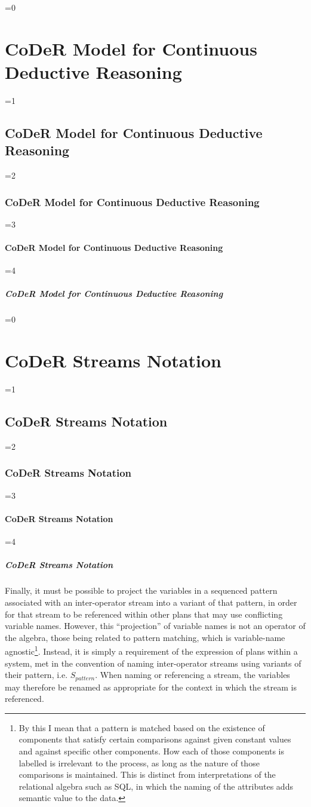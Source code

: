 \documentclass[twocolumn,preprint,3p,number]{elsarticle}
\theoremstyle{plain}
\theoremstyle{definition}
\newcounter{nestingdepth}
\newenvironment{nestedsection}[2]{
  \ifnum\value{nestingdepth}=0
    \chapter{#1}
  \else
    \ifnum\value{nestingdepth}=1
      \section{#1}
    \else
      \ifnum\value{nestingdepth}=2
        \subsection{#1}
      \else
        \ifnum\value{nestingdepth}=3
          \subsubsection{#1}
        \else
          \ifnum\value{nestingdepth}=4
            \paragraph{#1}
          \else
            \PackageError{nestedsections}{Maximum nesting level exceeded!}{uh oh!}
          \fi
        \fi
      \fi
    \fi
  \fi
  \addtocounter{nestingdepth}{1}
  \label{sec:#2}
}{\addtocounter{nestingdepth}{-1}}
\begin{document}
\begin{nestedsection}{CoDeR Model for Continuous Deductive Reasoning}{model}
\begin{nestedsection}{CoDeR Streams Notation}{model: stream notation}
  Finally, it must be possible to project the variables in a sequenced pattern associated with an inter-operator stream into a variant of that pattern, in order for that stream to be referenced within other plans that may use conflicting variable names.
  However, this ``projection'' of variable names is not an operator of the algebra, those being related to pattern matching, which is variable-name agnostic\footnote{
    By this I mean that a pattern is matched based on the existence of components that satisfy certain comparisons against given constant values and against specific other components.
    How each of those components is labelled is irrelevant to the process, as long as the nature of those comparisons is maintained.
    This is distinct from interpretations of the relational algebra such as SQL, in which the naming of the attributes adds semantic value to the data.}.
  Instead, it is simply a requirement of the expression of plans within a system, met in the convention of naming inter-operator streams using variants of their pattern, i.e. ${S_{pattern}}$.
  When naming or referencing a stream, the variables may therefore be renamed as appropriate for the context in which the stream is referenced.


\end{nestedsection}
\end{nestedsection}
\end{document}
